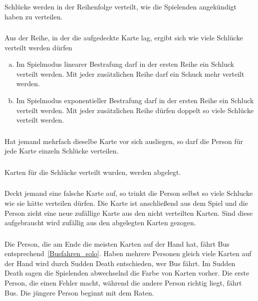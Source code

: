 \subsubsection{}
Schlücke werden in der Reihenfolge verteilt, wie die Spielenden angekündigt haben zu verteilen.

\subsubsection{}\label{Busfahren_group:Spielablauf:Bestrafung}
Aus der Reihe, in der die aufgedeckte Karte lag, ergibt sich wie viele Schlücke verteilt werden dürfen
\begin{enumerate}[a.]
    \item Im Spielmodus linearer Bestrafung darf in der ersten Reihe ein Schluck verteilt werden.
    Mit jeder zusätzlichen Reihe darf ein Schuck mehr verteilt werden.
    \item Im Spielmodus exponentieller Bestrafung darf in der ersten Reihe ein Schluck verteilt werden.
    Mit jeder zusätzlichen Reihe dürfen doppelt so viele Schlücke verteilt werden.
\end{enumerate}

\subsubsection{}
Hat jemand mehrfach dieselbe Karte vor sich ausliegen, so darf die Person für jede Karte einzeln Schlücke verteilen.

\subsubsection{}
Karten für die Schlücke verteilt wurden, werden abgelegt.

\subsubsection{}\label{Busfahren_group:Spielablauf:Ziehen}
Deckt jemand eine falsche Karte auf, so trinkt die Person selbst so viele Schlucke wie sie hätte verteilen dürfen.
Die Karte ist anschließend aus dem Spiel und die Person zieht eine neue zufällige Karte aus den nicht verteilten Karten.
Sind diese aufgebraucht wird zufällig aus den abgelegten Karten gezogen.

\subsubsection{}
Die Person, die am Ende die meisten Karten auf der Hand hat, fährt Bus entsprechend~\ref{Busfahren_solo}.
Haben mehrere Personen gleich viele Karten auf der Hand wird durch Sudden Death entschieden, wer Bus fährt.
Im Sudden Death sagen die Spielenden abwechselnd die Farbe von Karten vorher.
Die erste Person, die einen Fehler macht, während die andere Person richtig liegt, fährt Bus.
Die jüngere Person beginnt mit dem Raten.

